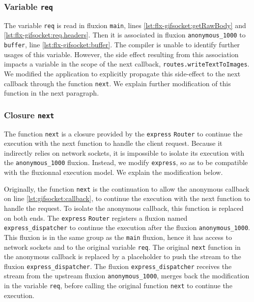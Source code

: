 \subsubsection{Variable \texttt{req}}

The variable \texttt{req} is read in fluxion \texttt{main}, lines \ref{lst:flx-gifsocket:getRawBody} and \ref{lst:flx-gifsocket:req.headers}.
Then it is associated in fluxion \texttt{anonymous\_1000} to \texttt{buffer}, line \ref{lst:flx-gifsocket:buffer}.
The compiler is unable to identify further usages of this variable.
However, the side effect resulting from this association impacts a variable in the scope of the next callback, \texttt{routes.writeTextToImages}.
We modified the application to explicitly propagate this side-effect to the next callback through the function \texttt{next}.
We explain further modification of this function in the next paragraph.


\subsubsection{Closure \texttt{next}}

The function \texttt{next} is a closure provided by the \texttt{express} \texttt{Router} to continue the execution with the next function to handle the client request.
Because it indirectly relies on network sockets, it is impossible to isolate its execution with the \texttt{anonymous\-\_1000} fluxion.
Instead, we modify \texttt{express}, so as to be compatible with the fluxionnal execution model.
We explain the modification below.%

Originally, the function \texttt{next} is the continuation to allow the anonymous callback on line \ref{lst:gifsocket:callback}, to continue the execution with the next function to handle the request.
To isolate the anonymous callback, this function is replaced on both ends.
The \texttt{express} \texttt{Router} registers a fluxion named \texttt{express\-\_dispatcher} to continue the execution after the fluxion \texttt{anonymous\-\_1000}.
This fluxion is in the same group as the \texttt{main} fluxion, hence it has access to network sockets and to the original variable \texttt{req}.
The original \texttt{next} function in the anonymous callback is replaced by a placeholder to push the stream to the fluxion \texttt{express\-\_dispatcher}.
The fluxion \texttt{express\-\_dispatcher} receives the stream from the upstream fluxion \texttt{anonymous\-\_1000}, merges back the modification in the variable \texttt{req}, before calling the original function \texttt{next} to continue the execution.

